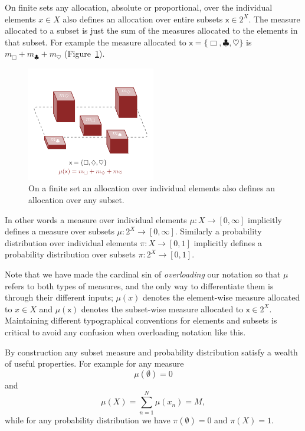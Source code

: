 \documentclass[
  letterpaper,
  DIV=11,
  numbers=noendperiod]{scrartcl}
\begin{document}
On finite sets any allocation, absolute or proportional, over the
individual elements \(x \in X\) also defines an allocation over entire
subsets \(\mathsf{x} \in 2^{X}\). The measure allocated to a subset is
just the sum of the measures allocated to the elements in that subset.
For example the measure allocated to
\(\mathsf{x} = \{ \Box, \clubsuit, \heartsuit \}\) is
\(m_{\Box} + m_{\clubsuit} + m_{\heartsuit}\)
(Figure~\ref{fig-subset_measure}).

\begin{figure}

{\centering \includegraphics[width=0.5\textwidth,height=\textheight]{figures/subset_measure/subset_measure.pdf}

}

\caption{\label{fig-subset_measure}On a finite set an allocation over
individual elements also defines an allocation over any subset.}

\end{figure}

In other words a measure over individual elements
\(\mu : X \rightarrow [0, \infty]\) implicitly defines a measure over
subsets \(\mu : 2^{X} \rightarrow [0, \infty]\). Similarly a probability
distribution over individual elements \(\pi : X \rightarrow [0, 1]\)
implicitly defines a probability distribution over subsets
\(\pi : 2^{X} \rightarrow [0, 1]\).

Note that we have made the cardinal sin of \emph{overloading} our
notation so that \(\mu\) refers to both types of measures, and the only
way to differentiate them is through their different inputs; \(\mu(x)\)
denotes the element-wise measure allocated to \(x \in X\) and
\(\mu( \mathsf{x} )\) denotes the subset-wise measure allocated to
\(\mathsf{x} \in 2^X\). Maintaining different typographical conventions
for elements and subsets is critical to avoid any confusion when
overloading notation like this.

By construction any subset measure and probability distribution satisfy
a wealth of useful properties. For example for any measure \[
\mu( \emptyset ) = 0
\] and \[
\mu( X ) = \sum_{n = 1}^{N} \mu(x_{n}) = M,
\] while for any probability distribution we have
\(\pi( \emptyset ) = 0\) and \(\pi( X ) = 1\).
\end{document}
